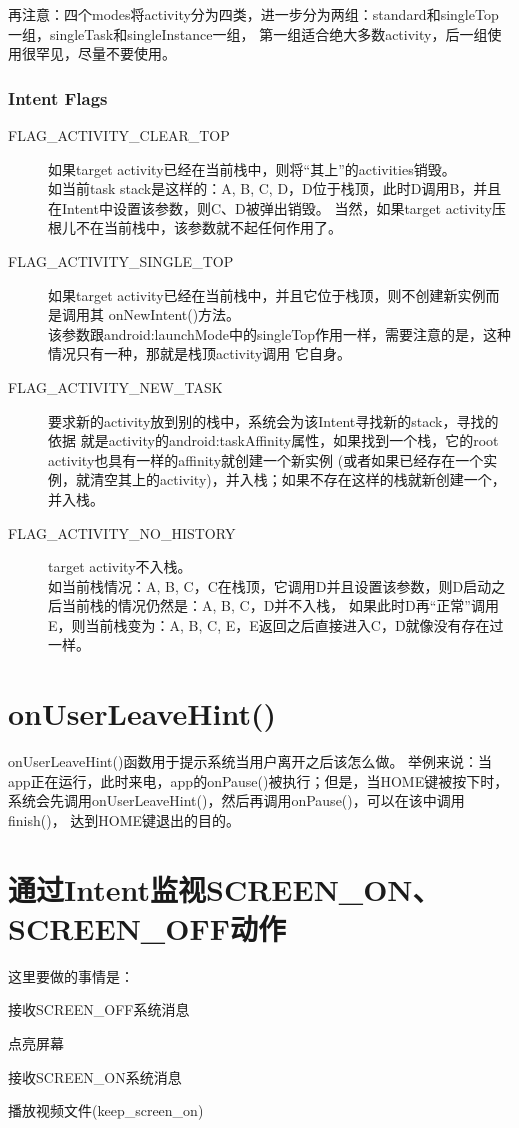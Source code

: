 再注意：四个modes将activity分为四类，进一步分为两组：standard和singleTop一组，singleTask和singleInstance一组，
第一组适合绝大多数activity，后一组使用很罕见，尽量不要使用。

\subsubsection[Intent Flags]{Intent Flags}

\begin{description}
  \item[FLAG\_ACTIVITY\_CLEAR\_TOP] 如果target activity已经在当前栈中，则将“其上”的activities销毁。\\
  如当前task stack是这样的：A, B, C, D，D位于栈顶，此时D调用B，并且在Intent中设置该参数，则C、D被弹出销毁。
  当然，如果target activity压根儿不在当前栈中，该参数就不起任何作用了。
  \item[FLAG\_ACTIVITY\_SINGLE\_TOP] 如果target activity已经在当前栈中，并且它位于栈顶，则不创建新实例而是调用其
  onNewIntent()方法。\\
  该参数跟android:launchMode中的singleTop作用一样，需要注意的是，这种情况只有一种，那就是栈顶activity调用
  它自身。
  \item[FLAG\_ACTIVITY\_NEW\_TASK] 要求新的activity放到别的栈中，系统会为该Intent寻找新的stack，寻找的依据
  就是activity的android:taskAffinity属性，如果找到一个栈，它的root activity也具有一样的affinity就创建一个新实例
  (或者如果已经存在一个实例，就清空其上的activity)，并入栈；如果不存在这样的栈就新创建一个，并入栈。
  \item[FLAG\_ACTIVITY\_NO\_HISTORY] target activity不入栈。\\
  如当前栈情况：A, B, C，C在栈顶，它调用D并且设置该参数，则D启动之后当前栈的情况仍然是：A, B, C，D并不入栈，
  如果此时D再“正常”调用E，则当前栈变为：A, B, C, E，E返回之后直接进入C，D就像没有存在过一样。
\end{description}


\section[onUserLeaveHint()]{onUserLeaveHint()}
onUserLeaveHint()函数用于提示系统当用户离开之后该怎么做。
举例来说：当app正在运行，此时来电，app的onPause()被执行；但是，当HOME键被按下时，
系统会先调用onUserLeaveHint()，然后再调用onPause()，可以在该中调用finish()，
达到HOME键退出的目的。

\section[通过Intent监视SCREEN\_ON、SCREEN\_OFF动作]{通过Intent监视SCREEN\_ON、SCREEN\_OFF动作}
这里要做的事情是：
\begin{coloredenumerate}
  \item 接收SCREEN\_OFF系统消息
  \item 点亮屏幕
  \item 接收SCREEN\_ON系统消息
  \item 播放视频文件(keep\_screen\_on)
\end{coloredenumerate}
